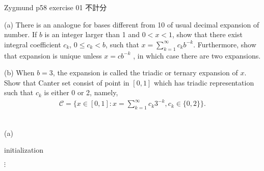 \documentclass[UTF8,a4paper,10pt]{article}
\begin{document}

  \begin{Problem}[]{Zygmund p58 exercise 01 不計分}

    (a) There is an analogue for bases different from 10 of usual decimal expansion of number. If $b$ is an integer larger than 1 and $0 < x < 1$,
    show that there exist integral coefficient $c_k$, $0 \leq c_k < b$, such that $x = \sum_{k=1}^{\infty}c_k b^{-k}$. Furthermore, show that expansion is unique unless
    $x = cb^{-k}$
    , in which case there are two expansions.  


    (b) When $b = 3$, the expansion is called the triadic or ternary
    expansion of $x$. Show that Canter set consist of point in $[0,1]$ which has triadic representation such that $c_k$ is either 0 or 2, namely,
    \begin{equation*}
      \begin{aligned}
        \mathcal{C}  = \{x \in [0, 1] : x =\sum_{k=1}^{\infty}c_k 3^{-k}, c_k \in \{0, 2\}\}.
      \end{aligned}
    \end{equation*}
  \end{Problem}

  \begin{solution}\,\\

    (a)

    \begin{algorithm}[H]
      initialization\;
      \;
    \end{algorithm}
  \end{solution}

  \(\vdots\)
\end{document}
